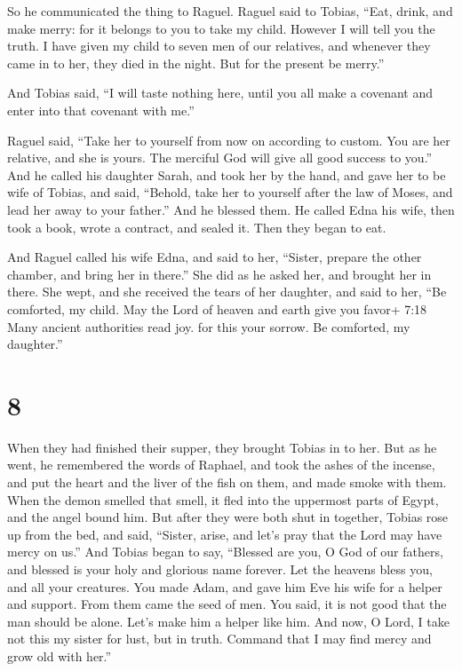  So he communicated the thing to Raguel. Raguel said to
Tobias, ``Eat, drink, and make merry:  for it belongs to
you to take my child. However I will tell you the truth.  I
have given my child to seven men of our relatives, and whenever they
came in to her, they died in the night. But for the present be merry.''

And Tobias said, ``I will taste nothing here, until you all make a
covenant and enter into that covenant with me.''

 Raguel said, ``Take her to yourself from now on according
to custom. You are her relative, and she is yours. The merciful God will
give all good success to you.''  And he called his daughter
Sarah, and took her by the hand, and gave her to be wife of Tobias, and
said, ``Behold, take her to yourself after the law of Moses, and lead
her away to your father.'' And he blessed them.  He called
Edna his wife, then took a book, wrote a contract, and sealed it.
 Then they began to eat.

 And Raguel called his wife Edna, and said to her,
``Sister, prepare the other chamber, and bring her in there.''
 She did as he asked her, and brought her in there. She
wept, and she received the tears of her daughter, and said to her,
 ``Be comforted, my child. May the Lord of heaven and earth
give you favor+ 7:18 Many ancient authorities read joy. for this your
sorrow. Be comforted, my daughter.''

\hypertarget{section-7}{%
\section{8}\label{section-7}}

 When they had finished their supper, they brought Tobias in
to her.  But as he went, he remembered the words of Raphael,
and took the ashes of the incense, and put the heart and the liver of
the fish on them, and made smoke with them.  When the demon
smelled that smell, it fled into the uppermost parts of Egypt, and the
angel bound him.  But after they were both shut in together,
Tobias rose up from the bed, and said, ``Sister, arise, and let's pray
that the Lord may have mercy on us.''  And Tobias began to
say, ``Blessed are you, O God of our fathers, and blessed is your holy
and glorious name forever. Let the heavens bless you, and all your
creatures.  You made Adam, and gave him Eve his wife for a
helper and support. From them came the seed of men. You said, it is not
good that the man should be alone. Let's make him a helper like him.
 And now, O Lord, I take not this my sister for lust, but in
truth. Command that I may find mercy and grow old with her.''


